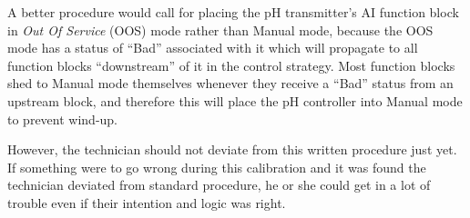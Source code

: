 A better procedure would call for placing the pH transmitter's AI function block in {\it Out Of Service} (OOS) mode rather than Manual mode, because the OOS mode has a status of ``Bad'' associated with it which will propagate to all function blocks ``downstream'' of it in the control strategy.  Most function blocks shed to Manual mode themselves whenever they receive a ``Bad'' status from an upstream block, and therefore this will place the pH controller into Manual mode to prevent wind-up.

However, the technician should not deviate from this written procedure just yet.  If something were to go wrong during this calibration and it was found the technician deviated from standard procedure, he or she could get in a lot of trouble even if their intention and logic was right.  




